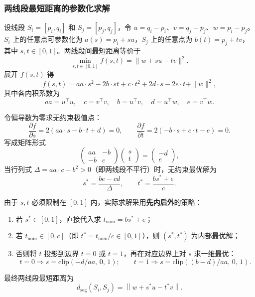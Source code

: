 \documentclass[12pt,a4paper,fontset=windows]{ctexart}
\begin{document}
\subsubsection{两线段最短距离的参数化求解}
设线段 $S_i=[p_i,q_i]$ 和 $S_j=[p_j,q_j]$，令 $u=q_i-p_i$、$v=q_j-p_j$、$w=p_i-p_j$。$S_i$ 上的任意点可参数化为 $a(s)=p_i+su$，$S_j$ 上的任意点为 $b(t)=p_j+tv$，其中 $s,t\in[0,1]$。两线段间最短距离等价于
\begin{equation}
\min_{s,t\in[0,1]} f(s,t)=\|w+su-tv\|^2.
\label{eq:segmin}
\end{equation}
展开 $f(s,t)$ 得
\begin{equation}
f(s,t)=aa\cdot s^2 - 2b\cdot st + c\cdot t^2 + 2d\cdot s - 2e\cdot t + \|w\|^2,
\label{eq:segexpand}
\end{equation}
其中各内积系数为
\begin{equation}
aa=u^\top u,\quad c=v^\top v,\quad b=u^\top v,\quad d=u^\top w,\quad e=v^\top w.
\end{equation}

令偏导数为零求无约束极值点：
\begin{equation}
\frac{\partial f}{\partial s}=2(aa\cdot s - b\cdot t + d)=0,\qquad
\frac{\partial f}{\partial t}=2(-b\cdot s + c\cdot t - e)=0.
\end{equation}
写成矩阵形式
\begin{equation}
\begin{pmatrix}aa & -b \\ -b & c\end{pmatrix}\begin{pmatrix}s \\ t\end{pmatrix}=\begin{pmatrix}-d \\ e\end{pmatrix},
\label{eq:seglinear}
\end{equation}
当行列式 $\Delta=aa\cdot c - b^2 > 0$（即两线段不平行）时，无约束最优解为
\begin{equation}
s^*=\frac{be-cd}{\Delta},\qquad t^*=\frac{bs^*+e}{c}.
\label{eq:seg_analytic}
\end{equation}

由于 $s,t$ 必须限制在 $[0,1]$ 内，实际求解采用\textbf{先内后外}的策略：
\begin{enumerate}[label=(\roman*)]
\item 若 $s^*\in[0,1]$，直接代入求 $t_{\mathrm{nom}}=bs^*+e$；
\item 若 $t_{\mathrm{nom}}\in[0,c]$（即 $t^*=t_{\mathrm{nom}}/c\in[0,1]$），则 $(s^*,t^*)$ 为内部最优解；
\item 否则将 $t$ 投影到边界 $t=0$ 或 $t=1$，再在对应边界上对 $s$ 求一维最优：
\begin{equation}
t=0 \Rightarrow s=\mathrm{clip}(-d/aa,\,0,\,1); \qquad
t=1 \Rightarrow s=\mathrm{clip}((b-d)/aa,\,0,\,1).
\end{equation}
\end{enumerate}
最终两线段最短距离为
\begin{equation}
d_{\mathrm{seg}}(S_i,S_j)=\left\|w+s^*u-t^*v\right\|.
\label{eq:segresult}
\end{equation}
\end{document}
